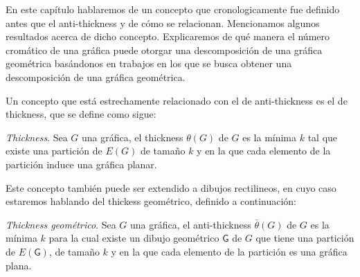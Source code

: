 

En este capítulo hablaremos de un concepto que cronologicamente fue definido antes
que el anti-thickness y de cómo se relacionan. Mencionamos algunos resultados acerca
de dicho concepto. Explicaremos de qué manera el número cromático de una
gráfica puede otorgar una descomposición de una gráfica geométrica basándonos
en trabajos en los que se busca obtener una descomposición de una gráfica geométrica.

Un concepto que está estrechamente relacionado con el de anti-thickness es el
de thickness, que se define como sigue:
\begin{definition}{\emph{Thickness}.}
  Sea $G$ una gráfica, el thickness $\theta(G)$ de $G$ es la mínima $k$ tal que existe
  una partición de $E(G)$ de tamaño $k$ y en la que cada elemento de la partición
  induce una gráfica planar.
\end{definition}
Este concepto también puede ser extendido a dibujos rectilineos,
en cuyo caso estaremos hablando del thickess geométrico, definido a continuación:
\begin{definition}{\emph{Thickness geométrico}.}
  Sea $G$ una gráfica, el anti-thickness $\bar{\theta}(G)$ de $G$
  es la mínima $k$ para la cual existe un dibujo geométrico $\mathsf{G}$ de $G$
  que tiene una partición de $E(\mathsf{G})$, de tamaño $k$ y en la que cada
  elemento de la partición es una gráfica plana.
\end{definition}




